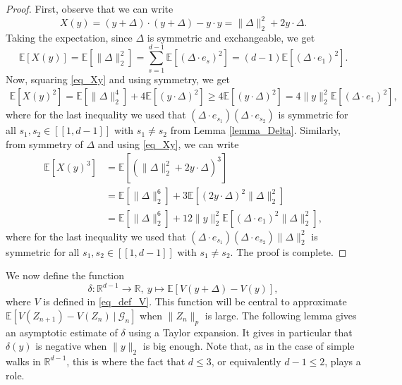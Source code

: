 \documentclass[a4paper, 11pt]{article}
\theoremstyle{plain}
\theoremstyle{definition}
\newcommand{\E}{\mathbb{E}}
\newcommand{\R}{\mathbb{R}}
\newcommand{\range}[2]{[\![#1,#2]\!]}
\numberwithin{equation}{section}
\begin{document}
\begin{proof}
    First, observe that we can write
        \begin{equation}
            \label{eq_Xy}
            X(y)=(y+\Delta)\cdot(y+\Delta)-y\cdot y=\|\Delta\|_2^2+2y\cdot\Delta.
        \end{equation}
    Taking the expectation, since $\Delta$ is symmetric and exchangeable, we get
        \[\E[X(y)]=\E[\|\Delta\|_2^2]=\sum_{s=1}^{d-1}\E[(\Delta\cdot e_s)^2]=(d-1)\E[(\Delta\cdot e_1)^2].\]
    Now, squaring \eqref{eq_Xy} and using symmetry, we get
        \begin{equation*}
            \begin{split}
                \E[X(y)^2]=\E[\|\Delta\|_2^4]+4\E[(y\cdot\Delta)^2]\geq4\E[(y\cdot\Delta)^2]=4\|y\|_2^2\E[(\Delta\cdot e_1)^2],
            \end{split}
        \end{equation*}
    where for the last inequality we used that $(\Delta\cdot e_{s_1})(\Delta\cdot e_{s_2})$ is symmetric for all $s_1,s_2\in\range{1}{d-1}$ with $s_1\neq s_2$ from Lemma \ref{lemma_Delta}. Similarly, from symmetry of $\Delta$ and using \eqref{eq_Xy}, we can write
        \begin{equation}
            \label{eq_Xy3}
            \begin{split}
                \E[X(y)^3]&=\E[(\|\Delta\|_2^2+2y\cdot\Delta)^3]\\
                &=\E[\|\Delta\|_2^6]+3\E[(2y\cdot\Delta)^2\|\Delta\|_2^2]\\
                &=\E[\|\Delta\|_2^6]+12\|y\|_2^2\E[(\Delta\cdot e_1)^2\|\Delta\|_2^2],
            \end{split}
        \end{equation}
    where for the last inequality we used that $(\Delta\cdot e_{s_1})(\Delta\cdot e_{s_2})\|\Delta\|_2^2$ is symmetric for all $s_1,s_2\in\range{1}{d-1}$ with $s_1\neq s_2$. The proof is complete.
\end{proof}


We now define the function
    \[\delta:\R^{d-1}\to\R,~y\mapsto\E[V(y+\Delta)-V(y)],\]
where $V$ is defined in \eqref{eq_def_V}. This function will be central to approximate $\E[V(Z_{n+1})-V(Z_n)~\vert~\mathcal G_n]$ when $\|Z_n\|_p$ is large. The following lemma gives an asymptotic estimate of $\delta$ using a Taylor expansion. It gives in particular that $\delta(y)$ is negative when $\|y\|_2$ is big enough. Note that, as in the case of simple walks in $\R^{d-1}$, this is where the fact that $d\leq 3$, or equivalently $d-1\leq2$, plays a role.
\end{document}
